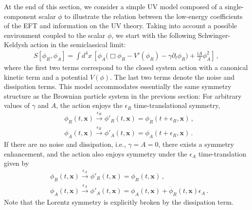 \documentclass[a4paper,11pt]{article}
\begin{document}
At the end of this section, we consider a simple UV model composed of a single-component scalar $\phi$ to illustrate the relation between the low-energy coefficients of the EFT and information on the UV theory.
Taking into account a possible environment coupled to the scalar $\phi$, 
we start with the following Schwinger-Keldysh action in the semiclassical limit:
\begin{align}
\label{scalar_model}
S[\phi_R,\phi_A] 
 =\int d^4x\,\left[
\phi_A\Big(\Box\phi_R-V'(\phi_R)
 - \gamma\partial_t\phi_R\Big)
 +\frac{iA}{2}\phi_A^2
 \right]\,,
\end{align}
where the first two terms correspond to the closed system action with a canonical kinetic term and a potential $V(\phi)$. The last two terms denote the noise and dissipation terms. This model accommodates essentially the same symmetry structure 
as the Brownian particle system in the previous section: For arbitrary values of $\gamma$ and $A$, the action enjoys the $\epsilon_R$ time-translational symmetry,
\begin{align}
\nonumber
 &\phi_R (t,\mathbf{x}) 
 \xrightarrow { \epsilon_R }  \phi'_R(t,\mathbf{x}) = \phi_R (t+\epsilon_R,\mathbf{x})
 \,,
 \\
&\phi_A (t,\mathbf{x})
 \xrightarrow { \epsilon_R } \phi'_A (t,\mathbf{x}) = \phi_A (t+\epsilon_R,\mathbf{x})\,.
\end{align}
If there are no noise and dissipation, i.e., $\gamma=A=0$, there exists a symmetry enhancement, and the action also enjoys symmetry under 
the $\epsilon_A$ time-translation given by 
\begin{align}
 \nonumber
 &\phi_R(t,\mathbf{x})
 \xrightarrow { \epsilon_A } \phi'_R(t,\mathbf{x}) = \phi_R(t,\mathbf{x}) 
 \,,
 \\
 &\phi_A (t,\mathbf{x})
 \xrightarrow { \epsilon_A } \phi'_A (t,\mathbf{x}) = \phi_A (t,\mathbf{x})+\dot{\phi}_R (t,\mathbf{x})\epsilon_A  \,.
\end{align}
Note that the Lorentz symmetry is explicitly broken by the dissipation term.
\end{document}
